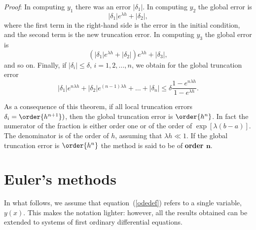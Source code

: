 \noindent
{\it Proof}: In computing $y_1$ there was an error $|\delta_1|$.  In
computing $y_2$ the global error is
%
\begin{equation}
 |\delta_1| e^{\lambda h} + |\delta_2|,
 \label{IVP.eq:38}
\end{equation}
where the first term in the right-hand side is the error in the
initial condition, and the second term is the new truncation error. In
computing $y_3$ the global error is
%
\begin{equation}
 (|\delta_1| e^{\lambda h} + |\delta_2| ) e^{\lambda h} + |\delta_3|,
 \label{IVP.eq:39}
\end{equation}
%
and so on.  Finally, if $|\delta_i|\le \delta$, $i=1,2,...,n$, we
obtain for the global truncation error
%
\begin{equation}
 |\delta_1| e^{n\lambda h} + |\delta_2| e^{(n-1)\lambda h} + \ldots +
 |\delta_n| \le \delta \frac{1-e^{n\lambda h}}{1-e^{\lambda h}}.
 \label{IVP.eq:40}
\end{equation}

As a consequence of this theorem, if all local truncation errors
$\delta_i=\order{h^{n+1}})$, then the global truncation error is $\order{h^n}$.
In fact the numerator of the fraction is either order one or of the
order of $\exp[\lambda(b-a)]$.  The denominator is of the order of
$h$, assuming that $\lambda h \ll 1$.  If the global truncation error
is $\order{h^n}$ the method is said to be of \textbf{order
  $\boldsymbol{n}$}.

\section{Euler's methods}

In what follows, we assume that equation~(\ref{odedef}) refers to a
single variable, $y(x)$.  This makes the notation lighter: however,
all the results obtained can be extended to systems of first ordinary
differential equations.

